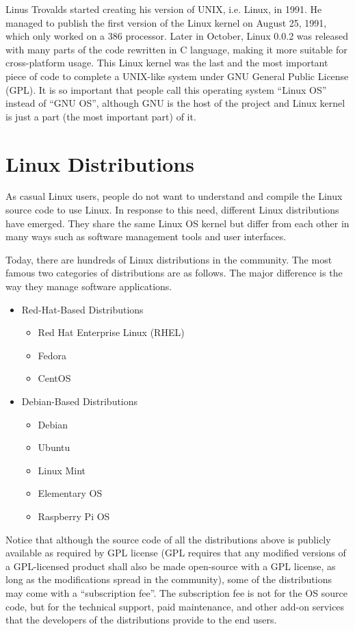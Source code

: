 Linus Trovalds started creating his version of UNIX, i.e. Linux, in 1991. He managed to publish the first version of the Linux kernel on August 25, 1991, which only worked on a 386 processor. Later in October, Linux 0.0.2 was released with many parts of the code rewritten in C language, making it more suitable for cross-platform usage. This Linux kernel was the last and the most important piece of code to complete a UNIX-like system under GNU General Public License (GPL). It is so important that people call this operating system ``Linux OS'' instead of ``GNU OS'', although GNU is the host of the project and Linux kernel is just a part (the most important part) of it.

\section{Linux Distributions}

As casual Linux users, people do not want to understand and compile the Linux source code to use Linux. In response to this need, different Linux distributions have emerged. They share the same Linux OS kernel but differ from each other in many ways such as software management tools and user interfaces.

Today, there are hundreds of Linux distributions in the community. The most famous two categories of distributions are as follows. The major difference is the way they manage software applications.
\begin{itemize}
  \item Red-Hat-Based Distributions
  \begin{itemize}
    \item Red Hat Enterprise Linux (RHEL)
    \item Fedora
    \item CentOS
  \end{itemize}
  \item Debian-Based Distributions
  \begin{itemize}
    \item Debian
    \item Ubuntu
    \item Linux Mint
    \item Elementary OS
    \item Raspberry Pi OS
  \end{itemize}
\end{itemize}

Notice that although the source code of all the distributions above is publicly available as required by GPL license (GPL requires that any modified versions of a GPL-licensed product shall also be made open-source with a GPL license, as long as the modifications spread in the community), some of the distributions may come with a ``subscription fee''. The subscription fee is not for the OS source code, but for the technical support, paid maintenance, and other add-on services that the developers of the distributions provide to the end users.
 
